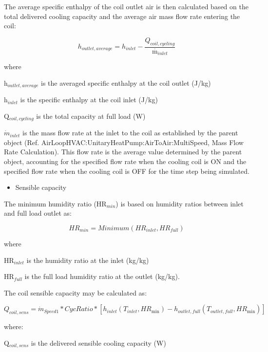 The average specific enthalpy of the coil outlet air is then calculated based on the total delivered cooling capacity and the average air mass flow rate entering the coil:

\begin{equation}
  h_{outlet,average} = h_{inlet} -  \frac{Q_{coil,cycling}}{{\mathop m\limits^\cdot}_{inlet}}
\end{equation}

where

h\(_{outlet,average}\) is the averaged specific enthalpy at the coil outlet (J/kg)

h\(_{inlet}\) is the specific enthalpy at the coil inlet (J/kg)

Q\(_{coil,cycling}\) is the total capacity at full load (W)

\({\dot{m}_{inlet}}\) is the mass flow rate at the inlet to the coil as established by the parent object (Ref. AirLoopHVAC:UnitaryHeatPump:AirToAir:MultiSpeed, Mass Flow Rate Calculation). This flow rate is the average value determined by the parent object, accounting for the specified flow rate when the cooling coil is ON and the specified flow rate when the cooling coil is OFF for the time step being simulated.

\begin{itemize}
  \item Sensible capacity
\end{itemize}

The minimum humidity ratio (HR\(_{min}\)) is based on humidity ratios between inlet and full load outlet as:

\begin{equation}
HR_{min} = Minimum(HR_{inlet}, HR_{full})
\end{equation}

where

HR\(_{inlet}\) is the humidity ratio at the inlet (kg/kg)

HR\(_{full}\) is the full load humidity ratio at the outlet (kg/kg).

The coil sensible capacity may be calculated as:

\begin{equation}
  Q_{coil,sens} = {\dot{m}_{Speed1}}*CycRatio*[{h_{inlet}}({T_{inlet}},H{R_{\min }}) - {h_{outlet,full}}({T_{outlet,full}},H{R_{\min }})]
\end{equation}

where:

Q\(_{coil,sens}\) is the delivered sensible cooling capacity (W)


